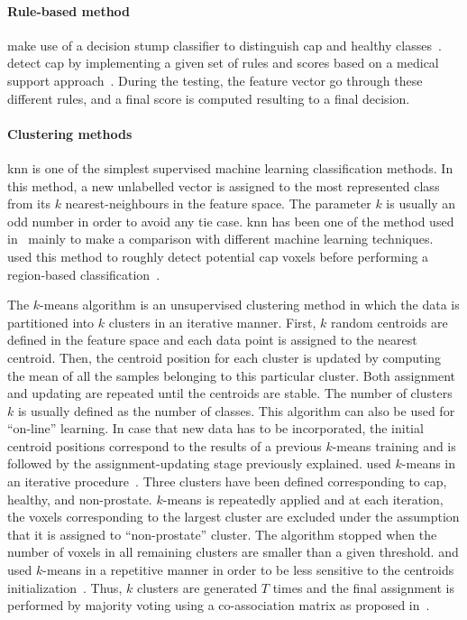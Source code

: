 \paragraph{Rule-based method}
\citeauthor{Lv2009} make use of a decision stump classifier to distinguish \ac{cap} and healthy classes~\cite{Lv2009}. 
\citeauthor{Puech2009} detect \ac{cap} by implementing a given set of rules and scores based on a medical support approach~\cite{Puech2009}.
During the testing, the feature vector go through these different rules, and a final score is computed resulting to a final decision.

\paragraph{Clustering methods}
\acf{knn} is one of the simplest supervised machine learning classification methods.
In this method, a new unlabelled vector is assigned to the most represented class from its $k$ nearest-neighbours in the feature space.
The parameter $k$ is usually an odd number in order to avoid any tie case.
\ac{knn} has been one of the method used in~\cite{Niaf2011,Niaf2012,rampun2016computerb} mainly to make a comparison with different machine learning techniques.
\citeauthor{Litjens2012} used this method to roughly detect potential \ac{cap} voxels before performing a region-based classification~\cite{Litjens2012}.

The $k$-means algorithm is an unsupervised clustering method in which the data is partitioned into $k$ clusters in an iterative manner.
First, $k$ random centroids are defined in the feature space and each data point is assigned to the nearest centroid.
Then, the centroid position for each cluster is updated by computing the mean of all the samples belonging to this particular cluster.
Both assignment and updating are repeated until the centroids are stable.
The number of clusters $k$ is usually defined as the number of classes.
This algorithm can also be used for ``on-line'' learning.
In case that new data has to be incorporated, the initial centroid positions correspond to the results of a previous $k$-means training and is followed by the assignment-updating stage previously explained.
\citeauthor{Tiwari2009} used $k$-means in an iterative procedure~\cite{Tiwari2007,Tiwari2009}.
Three clusters have been defined corresponding to \ac{cap}, healthy, and non-prostate.
$k$-means is repeatedly applied and at each iteration, the voxels corresponding to the largest cluster are excluded under the assumption that it is assigned to ``non-prostate'' cluster.
The algorithm stopped when the number of voxels in all remaining clusters are smaller than a given threshold.
\citeauthor{Tiwari2008} and \citeauthor{Viswanath2008a} used $k$-means in a repetitive manner in order to be less sensitive to the centroids initialization~\cite{Viswanath2008,Viswanath2008a,Tiwari2008}.
Thus, $k$ clusters are generated $T$ times and the final assignment is performed by majority voting using a co-association matrix as proposed in~\cite{Fred2005}.

